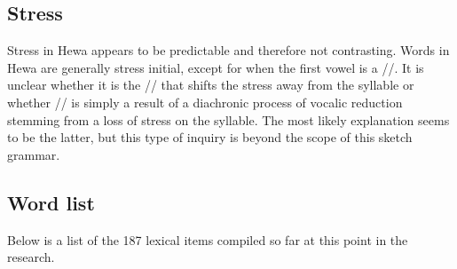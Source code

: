 \documentclass{article}
\begin{document}
\subsection{Stress}\label{sec:str}


Stress in Hewa appears to be predictable and therefore not contrasting. Words in Hewa are generally stress initial, except for when the first vowel is a /\textschwa/. It is unclear whether it is the /\textschwa/ that shifts the stress away from the syllable or whether /\textschwa/ is simply a result of a diachronic process of vocalic reduction stemming from a loss of stress on the syllable. The most likely explanation seems to be the latter, but this type of inquiry is beyond the scope of this sketch grammar.

\subsection*{Word list}\label{sec:wor}

Below is a list of the 187 lexical items compiled so far at this point in the research.
 
\end{document}
